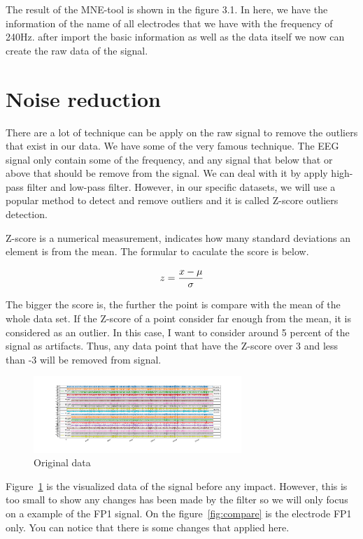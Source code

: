     The result of the MNE-tool is shown in the figure 3.1. In here, we have the information of the name of all electrodes that we have with the frequency of 240Hz. after import the basic information as well as the data itself we now can create the raw data of the signal.
    
\section{Noise reduction}
    There are a lot of technique can be apply on the raw signal to remove the outliers that exist in our data. We have some of the very famous technique. The EEG signal only contain some of the frequency, and any signal that below that or above that should be remove from the signal. 
    We can deal with it by apply high-pass filter and low-pass filter. However, in our specific datasets, we will use a popular method to detect and remove outliers and it is called Z-score outliers detection.
    
    Z-score is a numerical measurement, indicates how many standard deviations an element is from the mean\cite{z_score}. The formular to caculate the score is below.

    $$z={{x-\mu}  \over \sigma }$$
    

    The bigger the score is, the further the point is compare with the mean of the whole data set. If the Z-score of a point consider far enough from the mean, it is considered as an outlier. In this case, I want to consider around 5 percent of the signal as artifacts. Thus, any data point that have the Z-score over 3 and less than -3 will be removed from signal.
    
    \begin{figure}[h]
        \centering
        \includegraphics[width = 0.7\textwidth]{images/OriginalData.png}
        \caption{Original data}
        \label{fig:original_data}
    \end{figure}
    
    Figure~\ref{fig:original_data} is the visualized data of the signal before any impact. However, this is too small to show any changes has been made by the filter so we will only focus on a example of the FP1 signal. On the figure~\ref{fig:compare} is the electrode FP1 only. You can notice that there is some changes that applied here.
    
